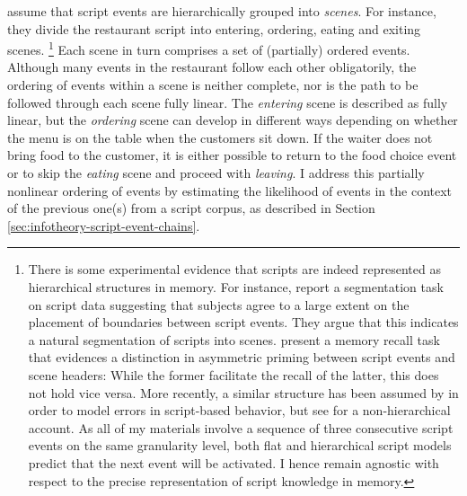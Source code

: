 \citet{schank.abelson1977} assume that script events are hierarchically grouped into \textit{scenes}. For instance, they divide the restaurant script into entering, ordering, eating and exiting scenes.%
%
\footnote{There is some experimental evidence that scripts are indeed represented as hierarchical structures in memory. For instance, \citet{bower.etal1979} report a segmentation task on script data suggesting that subjects agree to a large extent on the placement of boundaries between script events. They argue that this indicates a natural segmentation of scripts into scenes. \citet{abbott.etal1985} present a memory recall task that evidences a distinction in asymmetric priming between script events and scene headers: While the former facilitate the recall of the latter, this does not hold vice versa. More recently, a similar structure has been assumed by \citet{cooper.shallice2000} in order to model errors in script-based behavior, but see \citet{botvinick.plaut2004} for a non-hierarchical account. As all of my materials involve a sequence of three consecutive script events on the same granularity level, both flat and hierarchical script models predict that the next event will be activated. I hence remain agnostic with respect to the precise representation of script knowledge in memory.}\afterfn%
%
Each scene in turn comprises a set of (partially) ordered events. Although many events in the restaurant follow each other obligatorily, the ordering of events within a scene is neither complete, nor is the path to be followed through each scene fully linear. The \textit{entering} scene is described as fully linear, but the \textit{ordering} scene can develop in different ways depending on whether the menu is on the table when the customers sit down. If the waiter does not bring food to the customer, it is either possible to return to the food choice event or to skip the \textit{eating} scene and proceed with \textit{leaving}. I address this partially nonlinear ordering of events by estimating the likelihood of events in the context of the previous one(s) from a script corpus, as described in Section \ref{sec:infotheory-script-event-chains}.

